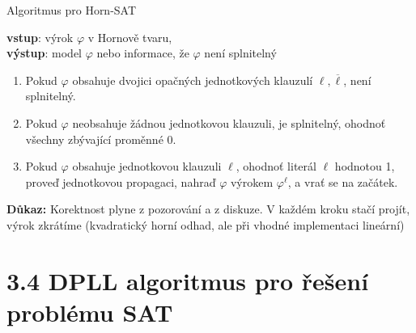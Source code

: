 \documentclass{beamer}
\begin{document}
\begin{frame}{Algoritmus pro Horn-SAT}

    \textbf{vstup}: výrok $\varphi$ v Hornově tvaru,\\ \textbf{výstup}: model $\varphi$ nebo informace, že $\varphi$ není splnitelný
    \begin{enumerate}
        \item Pokud $\varphi$ obsahuje dvojici opačných jednotkových klauzulí $\ell,\overline{\ell}$, není splnitelný.
        \item Pokud $\varphi$ neobsahuje žádnou jednotkovou klauzuli, je splnitelný, ohodnoť všechny zbývající proměnné 0.
        \item Pokud $\varphi$ obsahuje jednotkovou klauzuli $\ell$, ohodnoť literál $\ell$ hodnotou 1, proveď jednotkovou propagaci, nahraď $\varphi$ výrokem $\varphi^\ell$, a vrať se na začátek.
    \end{enumerate}


\vspace{-12pt}
\textbf{Důkaz:} {\small Korektnost plyne z pozorování a z diskuze. V každém kroku stačí projít, výrok zkrátíme (kvadratický horní odhad, ale při vhodné implementaci lineární)}

\end{frame}


\section{3.4 DPLL algoritmus pro řešení problému SAT}
\end{document}
